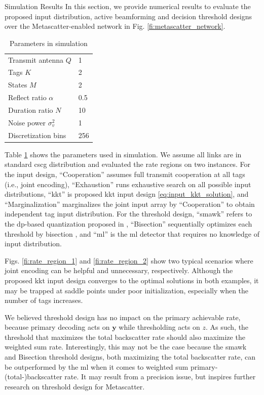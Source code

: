 \documentclass[journal]{IEEEtran}
\begin{document}
\begin{section}{Simulation Results}
	In this section, we provide numerical results to evaluate the proposed input distribution, active beamforming and decision threshold designs over the Metascatter-enabled network in Fig. \ref{fi:metascatter_network}.

	\begin{table}[t!]
		\centering
		\caption{Parameters in simulation}
		\begin{tabular}{ll}
			Transmit antenna $Q$     & 1   \\
			Tags $K$                 & 2   \\
			States $M$               & 2   \\
			Reflect ratio $\alpha$   & 0.5 \\
			Duration ratio $N$       & 10  \\
			Noise power $\sigma_v^2$ & 1   \\
			Discretization bins      & 256
		\end{tabular}
		\label{ta:parameters}
	\end{table}
	Table \ref{ta:parameters} shows the parameters used in simulation.
	We assume all links are in standard \gls{cscg} distribution and evaluated the rate regions on two instances.
	For the input design, ``Cooperation'' assumes full transmit cooperation at all tags (i.e., joint encoding), ``Exhaustion'' runs exhaustive search on all possible input distributions, ``\gls{kkt}'' is proposed \gls{kkt} input design \eqref{eq:input_kkt_solution}, and ``Marginalization'' marginalizes the joint input array by ``Cooperation'' to obtain independent tag input distribution.
	For the threshold design, ``\gls{smawk}'' refers to the \gls{dp}-based quantization proposed in \cite{He2021}, ``Bisection'' sequentially optimizes each threshold by bisection \cite{Nguyen2020a}, and ``\gls{ml}'' is the \gls{ml} detector that requires no knowledge of input distribution.

	Figs. \ref{fi:rate_region_1} and \ref{fi:rate_region_2} show two typical scenarios where joint encoding can be helpful and unnecessary, respectively.
	Although the proposed \gls{kkt} input design converges to the optimal solutions in both examples, it may be trapped at saddle points under poor initialization, especially when the number of tags increases.

	We believed threshold design has no impact on the primary achievable rate, because primary decoding acts on $\boldsymbol{y}$ while thresholding acts on $z$.
	As such, the threshold that maximizes the total backscatter rate should also maximize the weighted sum rate.
	Interestingly, this may not be the case because the \gls{smawk} and Bisection threshold designs, both maximizing the total backscatter rate, can be outperformed by the \gls{ml} when it comes to weighted sum primary-(total-)backscatter rate.
	It may result from a precision issue, but inspires further research on threshold design for Metascatter.


\end{section}
\end{document}
